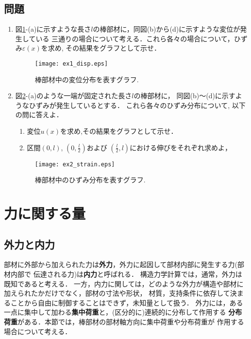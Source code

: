 \documentclass[10pt,a4j]{jbook}
\begin{document}
\subsection{問題}
\begin{enumerate}
\item
図\ref{fig:fig1}-(a)に示すような長さ$l$の棒部材に，同図(b)から(d)に示すような変位が発生している
三通りの場合について考える．これら各々の場合について，ひずみ$\varepsilon(x)$を求め, 
その結果をグラフとして示せ．
\begin{figure}[h]
	\begin{center}
	\texttt{[image: ex1\_disp.eps]} 

	\end{center}
	\caption{棒部材中の変位分布を表すグラフ.} 
	\label{fig:fig1}
\end{figure}
\item
図\ref{fig:fig2}-(a)のような一端が固定された長さ$l$の棒部材に，
同図(b)〜(d)に示すようなひずみが発生しているとする．
これら各々のひずみ分布について, 以下の問に答えよ．
	\begin{enumerate}
	\renewcommand{\theenumii}{\roman{enumii}}
	\item
		変位$u(x)$を求め,その結果をグラフとして示せ．
	\item
	区間$(0,l)$, $\left(0,\frac{l}{2}\right)$および
	$\left(\frac{l}{2},l\right)$における伸びをそれぞれ求めよ，
	\end{enumerate}
\begin{figure}[h]
	\begin{center}
	\texttt{[image: ex2\_strain.eps]} 
	\end{center}
	\caption{棒部材中のひずみ分布を表すグラフ.} 
	\label{fig:fig2}
\end{figure}
\end{enumerate}
\newpage
\section{力に関する量}
\subsection{外力と内力}
部材に外部から加えられた力は{\rm \bf 外力}，外力に起因して部材内部に発生する力(部材内部で
伝達される力)は{\rm \bf 内力}と呼ばれる．
構造力学計算では，通常，外力は既知であると考える．
一方，内力に関しては，どのような外力が構造や部材に加えられたかだけでなく，部材の寸法や形状，
材質，支持条件に依存して決まることから自由に制御することはできず，未知量として扱う．
外力には，ある一点に集中して加わる{\rm \bf 集中荷重}と，(区分的に)連続的に分布して作用する
{\rm \bf 分布荷重}がある．本節では，棒部材の部材軸方向に集中荷重や分布荷重が
作用する場合について考える．
\end{document}
